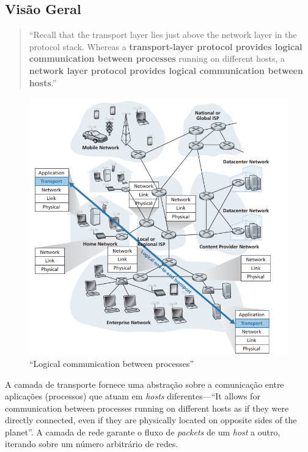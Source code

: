 \subsection[3.1 Visão Geral]{\hspace*{0.075 em}\raisebox{0.2 em}{$\pmb{\drsh}$} Visão Geral}
\label{subsec:overview}

\begin{quote}
    ``Recall that the transport layer lies just above the network layer in the protocol stack. Whereas a\textbf{ transport-layer protocol provides logical communication between processes}  running on different hosts, a \textbf{network layer protocol provides logical communication between hosts}.''\cite{Kurose2017}
\end{quote}

\begin{figure}[H]
    \centering
    \includegraphics[width = 0.7\linewidth]{img/3/logical-transport.png}
    \caption{``Logical communication between processes''\protect\cite{Kurose2017}}
    \label{fig:logical-transport}
\end{figure}

\noindent A camada de transporte fornece uma abstração sobre a comunicação entre aplicações (processos) que atuam em \textit{hosts} diferentes---``It allows for communication between processes running on different hosts as if they were directly connected, even if they are physically located on opposite sides of the planet''\cite{Kurose2017}. A camada de rede garante o fluxo de \textit{packets} de um \textit{host} a outro, iterando sobre um número arbitrário de redes.

